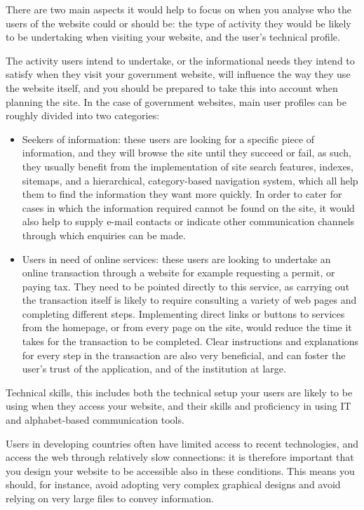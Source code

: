 There are two main aspects it would help to focus on when you analyse who the users of the website could or should be: the type of activity they would be likely to be undertaking when visiting your website, and the user’s technical profile.

The activity users intend to undertake, or the informational needs they intend to satisfy when they visit your government website, will influence the way they use the website itself, and you should be prepared to take this into account when planning the site. In the case of government websites, main user profiles can be roughly divided into two categories:

\begin{itemize}
	\item Seekers of information: these users are looking for a specific piece of information, and they will browse the site until they succeed or fail, as such, they usually benefit from the implementation of site search features, indexes, sitemaps, and a hierarchical, category-based navigation system, which all help them to find the information they want more quickly. In order to cater for cases in which the information required cannot be found on the site, it would also help to supply e-mail contacts or indicate other communication channels through which enquiries can be made.
	\item Users in need of online services: these users are looking to undertake an online transaction through a website for example requesting a permit, or paying tax. They need to be pointed directly to this service, as carrying out the transaction itself is likely to require consulting a variety of web pages and completing different steps. Implementing direct links or buttons to services from the homepage, or from every page on the site, would reduce the time it takes for the transaction to be completed. Clear instructions and explanations for every step in the transaction are also very beneficial, and can foster the user’s trust of the application, and of the institution at large.
\end{itemize}

Technical skills, this includes both the technical setup your users are likely to be using when they access your website, and their skills and proficiency in using IT and alphabet-based communication tools.

Users in developing countries often have limited access to recent technologies, and access the web through relatively slow connections: it is therefore important that you design your website to be accessible also in these conditions. This means you should, for instance, avoid adopting very complex graphical designs and avoid relying on very large files to convey information.

